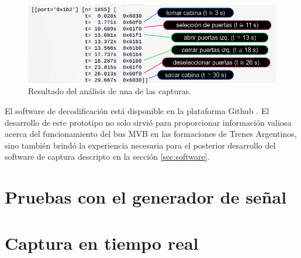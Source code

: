 \begin{figure}[htbp]
	\centering
	\includegraphics[width=\textwidth]{./Figures/analisis-captura.png}
	\caption[Resultado del análisis de una de las capturas.]{Resultado del análisis de una de las capturas.}
    \label{fig:analisis-captura}
\end{figure}



El software de decodificación está disponible en la plataforma Github \cite{mvbparse-py}. El desarrollo de este prototipo no solo sirvió para proporcionar información valiosa acerca del funcionamiento del bus MVB en las formaciones de Trenes Argentinos, sino también brindó la experiencia necesaria para el posterior desarrollo del software de captura descripto en la sección \ref{sec:software}.

\section{Pruebas con el generador de señal}
\section{Captura en tiempo real}
